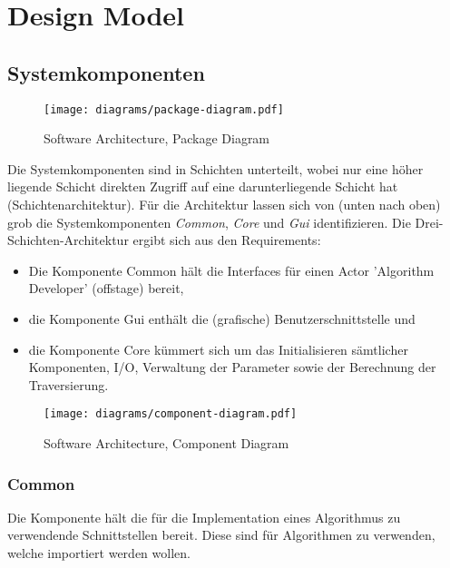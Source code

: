 \section{Design Model}
\label{sec:Design Model}
% 
\subsection{Systemkomponenten}
\label{subsec:Systemkomponenten}
% 
\begin{figure}[H]
    \centering
    \texttt{[image: diagrams/package-diagram.pdf]}
    \caption{Software Architecture, Package Diagram}
    \label{fig:package-diagram}
\end{figure}
% 
Die Systemkomponenten sind in Schichten unterteilt, wobei nur eine h\"oher liegende Schicht direkten Zugriff auf eine darunterliegende Schicht hat (Schichtenarchitektur). F\"ur die Architektur lassen sich von (unten nach oben) grob die Systemkomponenten \textit{Common}, \textit{Core} und \textit{Gui} identifizieren. Die Drei-Schichten-Architektur ergibt sich aus den Requirements:
\begin{itemize}
  \item Die Komponente Common h\"alt die Interfaces f\"ur einen Actor 'Algorithm Developer' (offstage) bereit,
  \item die Komponente Gui enth\"alt die (grafische) Benutzerschnittstelle und 
  \item die Komponente Core k\"ummert sich um das Initialisieren s\"amtlicher Komponenten, I/O, Verwaltung der Parameter sowie der Berechnung der Traversierung.
\end{itemize}
% 
\begin{figure}[H]
    \centering
    \texttt{[image: diagrams/component-diagram.pdf]}
    \caption{Software Architecture, Component Diagram}
    \label{fig:component-diagram}
\end{figure}
% 
\subsubsection{Common}
\label{subsubsec:Common}
Die Komponente h\"alt die f\"ur die Implementation eines Algorithmus zu verwendende Schnittstellen bereit. Diese sind f\"ur Algorithmen zu verwenden, welche importiert werden wollen.
% 
